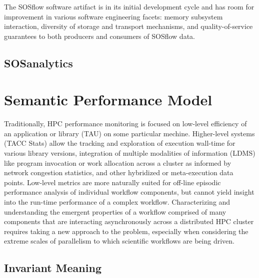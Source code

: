 The SOSflow software artifact is in its initial development cycle and
has room for improvement in various software engineering facets:
memory subsystem interaction, diversity of storage and transport
mechanisms, and quality-of-service guarantees to both producers and
consumers of SOSflow data.


\subsection{SOSanalytics}






\section{Semantic Performance Model}
Traditionally, HPC performance monitoring is focused on low-level
efficiency of an application or library (TAU) on some particular mechine.
Higher-level systems (TACC Stats) allow the tracking and exploration
of execution wall-time for various library versions, integration of
multiple modalities of information (LDMS) like program invocation or
work allocation across a cluster as informed by network congestion
statistics, and other hybridized or meta-execution data points.
Low-level metrics are more naturally suited for off-line episodic
performance analysis of individual workflow components, but cannot
yield insight into the run-time performance of a complex workflow.
Characterizing and understanding the emergent properties of a workflow
comprised of many components that are interacting asynchronously
across a distributed HPC cluster requires taking a new approach to the
problem, especially when considering the extreme scales of parallelism
to which scientific workflows are being driven.


\subsection{Invariant Meaning}

